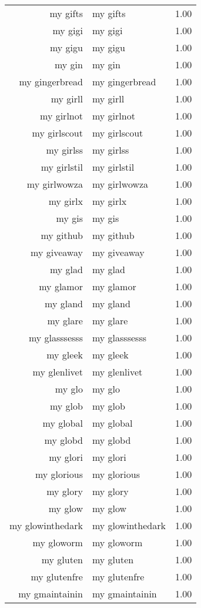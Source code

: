 \begin{table}[ht]
\begin{tabular}{rlr}
  my gifts & my gifts & 1.00 \\ 
  my gigi & my gigi & 1.00 \\ 
  my gigu & my gigu & 1.00 \\ 
  my gin & my gin & 1.00 \\ 
  my gingerbread & my gingerbread & 1.00 \\ 
  my girll & my girll & 1.00 \\ 
  my girlnot & my girlnot & 1.00 \\ 
  my girlscout & my girlscout & 1.00 \\ 
  my girlss & my girlss & 1.00 \\ 
  my girlstil & my girlstil & 1.00 \\ 
  my girlwowza & my girlwowza & 1.00 \\ 
  my girlx & my girlx & 1.00 \\ 
  my gis & my gis & 1.00 \\ 
  my github & my github & 1.00 \\ 
  my giveaway & my giveaway & 1.00 \\ 
  my glad & my glad & 1.00 \\ 
  my glamor & my glamor & 1.00 \\ 
  my gland & my gland & 1.00 \\ 
  my glare & my glare & 1.00 \\ 
  my glasssesss & my glasssesss & 1.00 \\ 
  my gleek & my gleek & 1.00 \\ 
  my glenlivet & my glenlivet & 1.00 \\ 
  my glo & my glo & 1.00 \\ 
  my glob & my glob & 1.00 \\ 
  my global & my global & 1.00 \\ 
  my globd & my globd & 1.00 \\ 
  my glori & my glori & 1.00 \\ 
  my glorious & my glorious & 1.00 \\ 
  my glory & my glory & 1.00 \\ 
  my glow & my glow & 1.00 \\ 
  my glowinthedark & my glowinthedark & 1.00 \\ 
  my gloworm & my gloworm & 1.00 \\ 
  my gluten & my gluten & 1.00 \\ 
  my glutenfre & my glutenfre & 1.00 \\ 
  my gmaintainin & my gmaintainin & 1.00 \\ 

\end{tabular}
\end{table}
